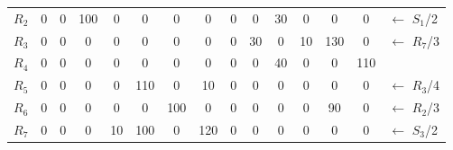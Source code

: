 \documentclass[12pt]{article}
\begin{document}
\begin{enumerate}
\begin{tabular}{|c|c|c|c|c|c|c|c|c|c|c|c|c|c|l}
$R_2$ & 0   & {\color[HTML]{000000} 0}        & {\color[HTML]{000000} 100}      & {\color[HTML]{000000} 0}        & {\color[HTML]{000000} 0}   & {\color[HTML]{000000} 0}   & {\color[HTML]{000000} 0}   & {\color[HTML]{000000} 0}  & {\color[HTML]{000000} 0}   & {\color[HTML]{000000} 30} & {\color[HTML]{000000} 0}   & {\color[HTML]{000000} 0}   & {\color[HTML]{000000} 0}   & ${\leftarrow}$ $S_1$/2 \\ \cline{1-14}
$R_3$ & 0   & {\color[HTML]{000000} 0}        & {\color[HTML]{000000} 0}        & {\color[HTML]{000000} 0}        & {\color[HTML]{000000} 0}   & {\color[HTML]{000000} 0}   & {\color[HTML]{000000} 0}   & {\color[HTML]{000000} 0}  & {\color[HTML]{000000} 30}  & {\color[HTML]{000000} 0}  & {\color[HTML]{000000} 10}  & {\color[HTML]{000000} 130} & {\color[HTML]{000000} 0}   & ${\leftarrow}$ $R_7$/3 \\ \cline{1-14}
$R_4$ & 0   & {\color[HTML]{000000} 0}        & {\color[HTML]{000000} 0}        & {\color[HTML]{000000} 0}        & {\color[HTML]{000000} 0}   & {\color[HTML]{000000} 0}   & {\color[HTML]{000000} 0}   & {\color[HTML]{000000} 0}  & {\color[HTML]{000000} 0}   & {\color[HTML]{000000} 40} & {\color[HTML]{000000} 0}   & {\color[HTML]{000000} 0}   & {\color[HTML]{000000} 110} &                        \\ \cline{1-14}
$R_5$ & 0   & {\color[HTML]{000000} 0}        & {\color[HTML]{000000} 0}        & {\color[HTML]{000000} 0}        & {\color[HTML]{000000} 110} & {\color[HTML]{000000} 0}   & {\color[HTML]{000000} 10}  & {\color[HTML]{000000} 0}  & {\color[HTML]{000000} 0}   & {\color[HTML]{000000} 0}  & {\color[HTML]{000000} 0}   & {\color[HTML]{000000} 0}   & {\color[HTML]{000000} 0}   & ${\leftarrow}$ $R_3$/4 \\ \cline{1-14}
$R_6$ & 0   & {\color[HTML]{000000} 0}        & {\color[HTML]{000000} 0}        & {\color[HTML]{000000} 0}        & {\color[HTML]{000000} 0}   & {\color[HTML]{000000} 100} & {\color[HTML]{000000} 0}   & {\color[HTML]{000000} 0}  & {\color[HTML]{000000} 0}   & {\color[HTML]{000000} 0}  & {\color[HTML]{000000} 0}   & {\color[HTML]{000000} 90}  & {\color[HTML]{000000} 0}   & ${\leftarrow}$ $R_2$/3 \\ \cline{1-14}
$R_7$ & 0   & {\color[HTML]{000000} 0}        & {\color[HTML]{000000} 0}        & {\color[HTML]{000000} 10}       & {\color[HTML]{000000} 100} & {\color[HTML]{000000} 0}   & {\color[HTML]{000000} 120} & {\color[HTML]{000000} 0}  & {\color[HTML]{000000} 0}   & {\color[HTML]{000000} 0}  & {\color[HTML]{000000} 0}   & {\color[HTML]{000000} 0}   & {\color[HTML]{000000} 0}   & ${\leftarrow}$ $S_3$/2 \\ \cline{1-14}

\end{tabular}
\end{enumerate}
\end{document}
